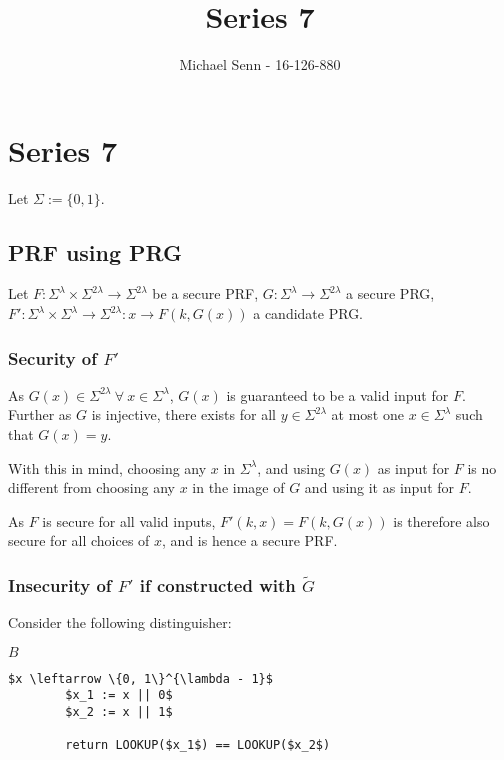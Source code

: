 \documentclass[a4paper]{scrreprt}
\title{Series 7}
\author{Michael Senn \maillink{michael.senn@students.unibe.ch} - 16-126-880}
\date{\printdate}
\begin{document}
\maketitle


\setcounter{chapter}{6}
\chapter{Series 7}

Let $\Sigma := \{0, 1\}$.

\section{PRF using PRG}

Let $F: \Sigma^\lambda \times \Sigma^{2 \lambda} \rightarrow \Sigma^{2
\lambda}$ be a secure PRF, $G: \Sigma^\lambda \rightarrow \Sigma^{2 \lambda}$ a
secure PRG, $F': \Sigma^\lambda \times \Sigma^\lambda \rightarrow \Sigma^{2
\lambda}: x \rightarrow F(k, G(x))$ a candidate PRG.

\subsection{Security of $F'$}

As $G(x) \in \Sigma^{2\lambda}\ \forall\ x \in \Sigma^\lambda$,
$G(x)$ is guaranteed to be a valid input for $F$. Further as $G$ is injective,
there exists for all $y \in \Sigma^{2 \lambda}$ at most one $x \in
\Sigma^\lambda$ such that $G(x) = y$.

With this in mind, choosing any $x$ in $\Sigma^\lambda$, and using $G(x)$ as
input for $F$ is no different from choosing any $x$ in the image of $G$ and
using it as input for $F$.

As $F$ is secure for all valid inputs, $F'(k, x) = F(k, G(x))$ is therefore
also secure for all choices of $x$, and is hence a secure PRF.


\subsection{Insecurity of $F'$ if constructed with $\tilde{G}$} 

Consider the following distinguisher:

\begin{library}{$B$}
	\begin{lstlisting}[mathescape=true]
		$x \leftarrow \{0, 1\}^{\lambda - 1}$
		$x_1 := x || 0$
		$x_2 := x || 1$

		return LOOKUP($x_1$) == LOOKUP($x_2$)
	\end{lstlisting}
\end{library}
\end{document}
